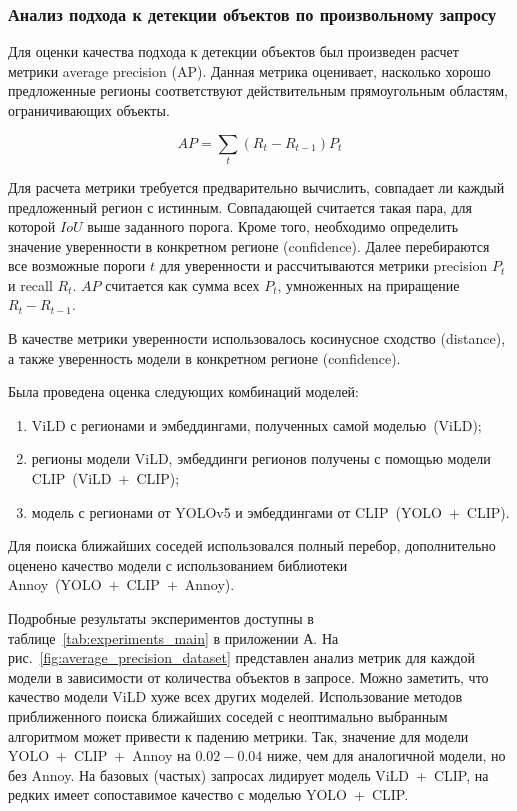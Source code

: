 \documentclass[a4paper,14pt]{article}
\begin{document}
    \subsubsection{Анализ подхода к детекции объектов по произвольному запросу} \label{fsod_exp}

	Для оценки качества подхода к детекции объектов был произведен расчет метрики average precision (AP).
	Данная метрика оценивает, насколько хорошо предложенные регионы соответствуют действительным прямоугольным областям, ограничивающих объекты.
	
	$$ AP = \sum_{t} (R_t - R_{t - 1}) P_t $$
	
	Для расчета метрики требуется предварительно вычислить, совпадает ли каждый предложенный регион с истинным.
	Совпадающей считается такая пара, для которой $IoU$ выше заданного порога.
	Кроме того, необходимо определить значение уверенности в конкретном регионе (confidence).
	Далее перебираются все возможные пороги $t$ для уверенности и рассчитываются метрики precision $P_t$ и recall $R_t$.
	$AP$ считается как сумма всех $P_t$, умноженных на приращение $R_t - R_{t - 1}$.
	
	В качестве метрики уверенности использовалось косинусное сходство (distance), а также уверенность модели в конкретном регионе (confidence).
	
	Была проведена оценка следующих комбинаций моделей:
	\begin{enumerate}
		[1)]
		\itemsep0em
		\item ViLD с регионами и эмбеддингами, полученных самой моделью~(ViLD);
		\item регионы модели ViLD, эмбеддинги регионов получены с помощью модели CLIP~(ViLD~+~CLIP);
		\item модель с регионами от YOLOv5 и эмбеддингами от CLIP~(YOLO~+~CLIP).
	\end{enumerate}
	 Для поиска ближайших соседей использовался полный перебор, дополнительно оценено качество модели с использованием библиотеки Annoy~(YOLO~+~CLIP~+~Annoy).
	
	
	Подробные результаты экспериментов доступны в таблице~\ref{tab:experiments_main} в приложении А.
	На рис.~\ref{fig:average_precision_dataset} представлен анализ метрик для каждой модели в зависимости от количества объектов в запросе.
	Можно заметить, что качество модели ViLD хуже всех других моделей.
	Использование методов приближенного поиска ближайших соседей с неоптимально выбранным алгоритмом может привести к падению метрики.
	Так, значение для модели YOLO~+~CLIP~+~Annoy на $0.02 - 0.04$ ниже, чем для аналогичной модели, но без Annoy.
	На базовых (частых) запросах лидирует модель ViLD~+~CLIP, на редких имеет сопоставимое качество с моделью YOLO~+~CLIP.
	
\end{document}
